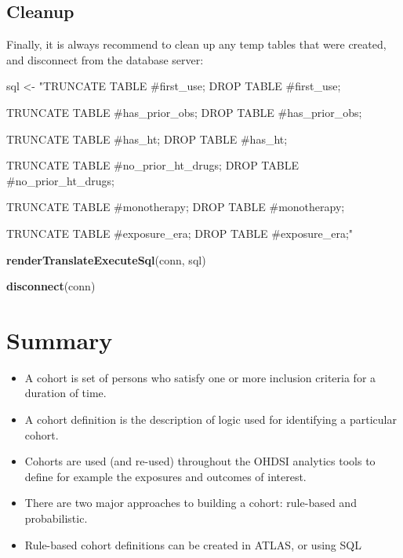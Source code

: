 \documentclass[11pt]{book}
\newenvironment{Shaded}{\begin{snugshade}}{\end{snugshade}}
\newcommand{\KeywordTok}[1]{\textcolor[rgb]{0.13,0.29,0.53}{\textbf{#1}}}
\newcommand{\NormalTok}[1]{#1}
\newcommand{\StringTok}[1]{\textcolor[rgb]{0.31,0.60,0.02}{#1}}
\providecommand{\tightlist}{%
  \setlength{\itemsep}{0pt}\setlength{\parskip}{0pt}}
\theoremstyle{definition}
\theoremstyle{definition}
\theoremstyle{definition}
\theoremstyle{remark}
\let\BeginKnitrBlock\begin \let\EndKnitrBlock\end
\begin{document}
\hypertarget{cleanup}{%
\subsection{Cleanup}\label{cleanup}}

Finally, it is always recommend to clean up any temp tables that were created, and disconnect from the database server:

\begin{Shaded}
\begin{Highlighting}[]
\NormalTok{sql <-}\StringTok{ "TRUNCATE TABLE #first_use;}
\StringTok{DROP TABLE #first_use;}

\StringTok{TRUNCATE TABLE #has_prior_obs;}
\StringTok{DROP TABLE #has_prior_obs;}

\StringTok{TRUNCATE TABLE #has_ht;}
\StringTok{DROP TABLE #has_ht;}

\StringTok{TRUNCATE TABLE #no_prior_ht_drugs;}
\StringTok{DROP TABLE #no_prior_ht_drugs;}

\StringTok{TRUNCATE TABLE #monotherapy;}
\StringTok{DROP TABLE #monotherapy;}

\StringTok{TRUNCATE TABLE #exposure_era;}
\StringTok{DROP TABLE #exposure_era;"}

\KeywordTok{renderTranslateExecuteSql}\NormalTok{(conn, sql)}

\KeywordTok{disconnect}\NormalTok{(conn)}
\end{Highlighting}
\end{Shaded}

\hypertarget{summary-7}{%
\section{Summary}\label{summary-7}}

\BeginKnitrBlock{rmdsummary}
\begin{itemize}
\tightlist
\item
  A cohort is set of persons who satisfy one or more inclusion criteria for a duration of time.
\item
  A cohort definition is the description of logic used for identifying a particular cohort.
\item
  Cohorts are used (and re-used) throughout the OHDSI analytics tools to define for example the exposures and outcomes of interest.
\item
  There are two major approaches to building a cohort: rule-based and probabilistic.
\item
  Rule-based cohort definitions can be created in ATLAS, or using SQL
\end{itemize}
\EndKnitrBlock{rmdsummary}
\end{document}
